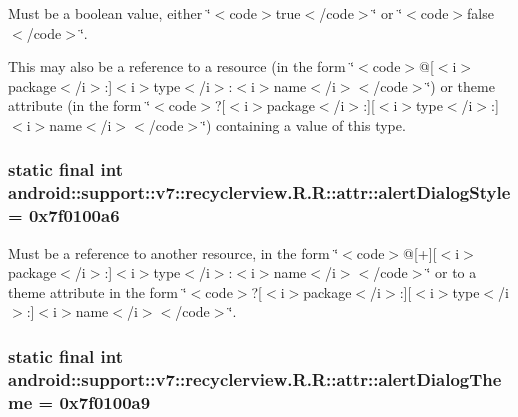 Must be a boolean value, either \char`\"{}$<$code$>$true$<$/code$>$\char`\"{} or \char`\"{}$<$code$>$false$<$/code$>$\char`\"{}. 

This may also be a reference to a resource (in the form \char`\"{}$<$code$>$@\mbox{[}$<$i$>$package$<$/i$>$:\mbox{]}$<$i$>$type$<$/i$>$:$<$i$>$name$<$/i$>$$<$/code$>$\char`\"{}) or theme attribute (in the form \char`\"{}$<$code$>$?\mbox{[}$<$i$>$package$<$/i$>$:\mbox{]}\mbox{[}$<$i$>$type$<$/i$>$:\mbox{]}$<$i$>$name$<$/i$>$$<$/code$>$\char`\"{}) containing a value of this type. \hypertarget{classandroid_1_1support_1_1v7_1_1recyclerview_1_1_r_1_1attr_3a08d7a0e31ca7cd54b0778a655dd2b1}{
\subsubsection[{alertDialogStyle}]{\setlength{\rightskip}{0pt plus 5cm}static final int android::support::v7::recyclerview.R.R::attr::alertDialogStyle = 0x7f0100a6}}
\label{classandroid_1_1support_1_1v7_1_1recyclerview_1_1_r_1_1attr_3a08d7a0e31ca7cd54b0778a655dd2b1}


Must be a reference to another resource, in the form \char`\"{}$<$code$>$@\mbox{[}+\mbox{]}\mbox{[}$<$i$>$package$<$/i$>$:\mbox{]}$<$i$>$type$<$/i$>$:$<$i$>$name$<$/i$>$$<$/code$>$\char`\"{} or to a theme attribute in the form \char`\"{}$<$code$>$?\mbox{[}$<$i$>$package$<$/i$>$:\mbox{]}\mbox{[}$<$i$>$type$<$/i$>$:\mbox{]}$<$i$>$name$<$/i$>$$<$/code$>$\char`\"{}. \hypertarget{classandroid_1_1support_1_1v7_1_1recyclerview_1_1_r_1_1attr_63b602e9ad6a04293360c79a123bd93d}{
\subsubsection[{alertDialogTheme}]{\setlength{\rightskip}{0pt plus 5cm}static final int android::support::v7::recyclerview.R.R::attr::alertDialogTheme = 0x7f0100a9}}
\label{classandroid_1_1support_1_1v7_1_1recyclerview_1_1_r_1_1attr_63b602e9ad6a04293360c79a123bd93d}


